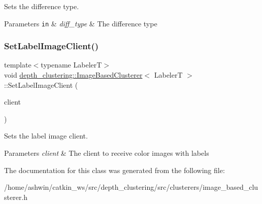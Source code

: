 Sets the difference type. 


\begin{DoxyParams}[1]{Parameters}
\mbox{\tt in}  & {\em diff\+\_\+type} & The difference type \\
\hline
\end{DoxyParams}
\mbox{\label{classdepth__clustering_1_1ImageBasedClusterer_a6af0de0dad7450c34c655fb447886716}} 
\subsubsection{\texorpdfstring{Set\+Label\+Image\+Client()}{SetLabelImageClient()}}
{\footnotesize\ttfamily template$<$typename LabelerT$>$ \\
void \hyperlink{classdepth__clustering_1_1ImageBasedClusterer}{depth\+\_\+clustering\+::\+Image\+Based\+Clusterer}$<$ LabelerT $>$\+::Set\+Label\+Image\+Client (\begin{DoxyParamCaption}\item[{\hyperlink{classdepth__clustering_1_1AbstractClient}{Abstract\+Client}$<$ cv\+::\+Mat $>$ $\ast$}]{client }\end{DoxyParamCaption})\hspace{0.3cm}{\ttfamily [inline]}}



Sets the label image client. 


\begin{DoxyParams}{Parameters}
{\em client} & The client to receive color images with labels \\
\hline
\end{DoxyParams}


The documentation for this class was generated from the following file\+:\begin{DoxyCompactItemize}
\item 
/home/ashwin/catkin\+\_\+ws/src/depth\+\_\+clustering/src/clusterers/image\+\_\+based\+\_\+clusterer.\+h\end{DoxyCompactItemize}
